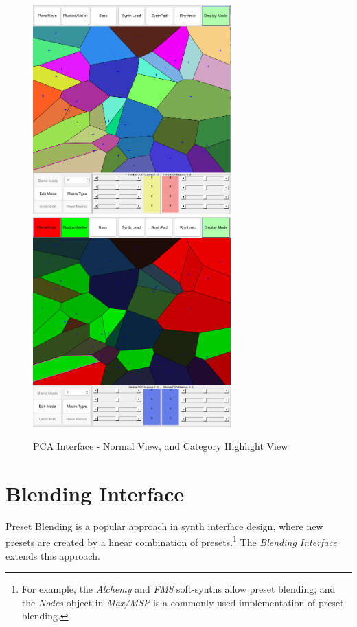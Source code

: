 \documentclass[11pt, oneside]{report}   	%
\begin{document}
\begin{figure}[h] 
	\centering
	\hspace*{-0.2cm}
	\includegraphics[width = 3.0in]{PCAInterface1.png}
	\hspace*{0.1cm}
	\includegraphics[width = 3.0in]{PCAInterface2.png}
	\caption{PCA Interface - Normal View, and Category Highlight View}
	\label{fig:PCAInterface}
\end{figure}

\section{Blending Interface}
Preset Blending is a popular approach in synth interface design, where new presets are created by a linear combination of presets.\footnote{For example, the \emph{Alchemy} and \emph{FM8} soft-synths allow preset blending, and the  \emph{Nodes} object in \emph{Max/MSP} is a commonly used implementation of preset blending.} The \emph{Blending Interface} extends this approach.
\end{document}
